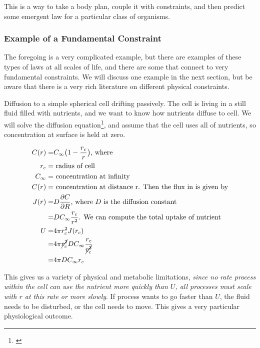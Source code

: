 \documentclass[]{article}
\begin{document}
This is a  way to take a body plan, couple it with constraints, and then predict some emergent law for a particular class of organisms.

\subsubsection{Example of a Fundamental Constraint}

The foregoing is a very complicated example, but there are examples of these types of laws at all scales of life, and there are some that connect to very fundamental constraints. We will discuss one example in the next section, but be aware that there is a very rich literature on different physical constraints.

Diffusion to a simple spherical cell drifting passively. The cell is living in a still fluid filled with nutrients, and we want to know how nutrients diffuse to cell. We will solve the diffusion equation\footnote{\cite[Lecture 3.8: Systematics and Limits of Metabolic Rates]{sfi2020}}, and assume that the cell uses all of nutrients, so concentration at surface is held at zero.

\begin{align*}
	C(r) =& C_{\infty}\big(1 - \frac{r_c}{r}\big)\text{, where}\\
	r_c=& \text{ radius of cell}\\
	C_{\infty} =& \text{ concentration at infinity}\\
	C(r) =& \text{ concentration at distance r. Then the flux in is given by}\\
	J(r) =& D\frac{\partial C}{\partial R} \text{, where $D$ is the diffusion constant}\\
	  =& D C_{\infty} \frac{r_c}{r^2}\text{. We can compute the total uptake of nutrient}\\
	U =& 4 \pi r_c^2 J(r_c) \\
	=& 4 \pi\cancel{ r_c^2} D C_{\infty} \frac{r_c}{\cancel{r_c^2}}\\
	=&4 \pi D C_{\infty} r_c 
\end{align*}

This gives us a variety of physical and metabolic limitations, \emph{since no rate process within the cell can use the nutrient more quickly than $U$, all processes must scale with $r$ at this rate or more slowly}. If process wants to go faster than $U$, the fluid needs to be disturbed, or the cell needs to move. This gives a very particular physiological outcome.
\end{document}
